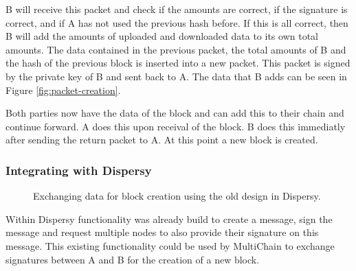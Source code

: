 B will receive this packet and check if the amounts are correct, if the signature is correct,
and if A has not used the previous hash before.
If this is all correct,
then B will add the amounts of uploaded and downloaded data to its own total amounts.
The data contained in the previous packet, the total amounts of B and the hash of the previous block is
inserted into a new packet.
This packet is signed by the private key of B and sent back to A.
The data that B adds can be seen in Figure \ref{fig:packet-creation}.

Both parties now have the data of the block and can add this to their chain and continue forward.
A does this upon receival of the block.
B does this immediatly after sending the return packet to A.
At this point a new block is created.

\subsubsection{Integrating with Dispersy}
\begin{figure}[!h]
\centering
{}

\caption{Exchanging data for block creation using the old design in Dispersy.}
\label{fig:block-creation-old}
\end{figure}
Within Dispersy functionality was already build to create a message, sign the message
and request multiple nodes to also provide their signature on this message.
This existing functionality could be used by MultiChain to exchange signatures
between A and B for the creation of a new block.

